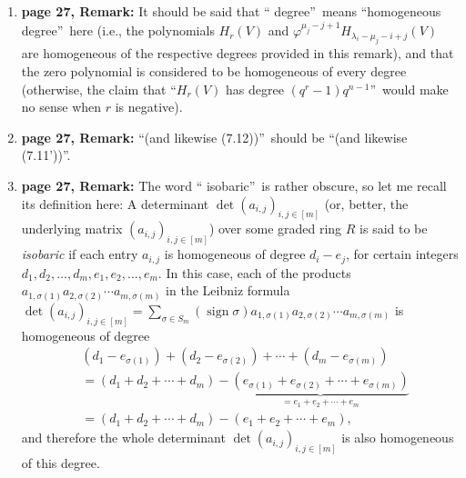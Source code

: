 \documentclass[numbers=enddot,12pt,final,onecolumn,notitlepage]{scrartcl}%
\theoremstyle{definition}
\let\sumnonlimits\sum
\renewcommand{\sum}{\sumnonlimits\limits}
\begin{document}
\begin{enumerate}
\item \textbf{page 27, Remark:} It should be said that \textquotedblleft
degree\textquotedblright\ means \textquotedblleft homogeneous
degree\textquotedblright\ here (i.e., the polynomials $H_{r}\left(  V\right)
$ and $\varphi^{\mu_{j}-j+1}H_{\lambda_{i}-\mu_{j}-i+j}\left(  V\right)  $ are
homogeneous of the respective degrees provided in this remark), and that the
zero polynomial is considered to be homogeneous of every degree (otherwise,
the claim that \textquotedblleft$H_{r}\left(  V\right)  $ has degree $\left(
q^{r}-1\right)  q^{n-1}$\textquotedblright\ would make no sense when $r$ is negative).

\item \textbf{page 27, Remark:} \textquotedblleft(and likewise
(7.12))\textquotedblright\ should be \textquotedblleft(and likewise
(7.11'))\textquotedblright.

\item \textbf{page 27, Remark:} The word \textquotedblleft
isobaric\textquotedblright\ is rather obscure, so let me recall its definition
here: A determinant $\det\left(  a_{i,j}\right)  _{i,j\in\left[  m\right]  }$
(or, better, the underlying matrix $\left(  a_{i,j}\right)  _{i,j\in\left[
m\right]  }$) over some graded ring $R$ is said to be \emph{isobaric} if each
entry $a_{i,j}$ is homogeneous of degree $d_{i}-e_{j}$, for certain integers
$d_{1},d_{2},\ldots,d_{m},e_{1},e_{2},\ldots,e_{m}$. In this case, each of the
products $a_{1,\sigma\left(  1\right)  }a_{2,\sigma\left(  2\right)  }\cdots
a_{m,\sigma\left(  m\right)  }$ in the Leibniz formula $\det\left(
a_{i,j}\right)  _{i,j\in\left[  m\right]  }=\sum_{\sigma\in S_{m}}\left(
\operatorname*{sign}\sigma\right)  a_{1,\sigma\left(  1\right)  }%
a_{2,\sigma\left(  2\right)  }\cdots a_{m,\sigma\left(  m\right)  }$ is
homogeneous of degree%
\begin{align*}
&  \left(  d_{1}-e_{\sigma\left(  1\right)  }\right)  +\left(  d_{2}%
-e_{\sigma\left(  2\right)  }\right)  +\cdots+\left(  d_{m}-e_{\sigma\left(
m\right)  }\right) \\
&  =\left(  d_{1}+d_{2}+\cdots+d_{m}\right)  -\underbrace{\left(
e_{\sigma\left(  1\right)  }+e_{\sigma\left(  2\right)  }+\cdots
+e_{\sigma\left(  m\right)  }\right)  }_{=e_{1}+e_{2}+\cdots+e_{m}}\\
&  =\left(  d_{1}+d_{2}+\cdots+d_{m}\right)  -\left(  e_{1}+e_{2}+\cdots
+e_{m}\right)  ,
\end{align*}
and therefore the whole determinant $\det\left(  a_{i,j}\right)
_{i,j\in\left[  m\right]  }$ is also homogeneous of this degree.


\end{enumerate}
\end{document}
